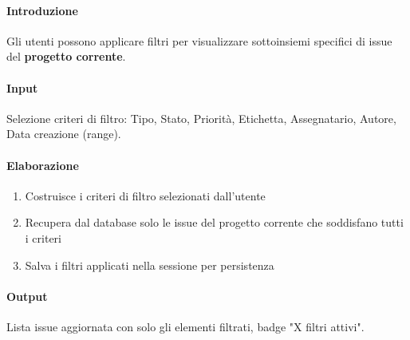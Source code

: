 \begin{reqbox}[title=REQ-FUN-15: Filtra Issue]
\label{subsubsec:req-filtra-issue}

\paragraph{Introduzione}
Gli utenti possono applicare filtri per visualizzare sottoinsiemi specifici di issue del \textbf{progetto corrente}.

\paragraph{Input}
Selezione criteri di filtro: Tipo, Stato, Priorità, Etichetta, Assegnatario, Autore, Data creazione (range).

\paragraph{Elaborazione}
\begin{enumerate}[leftmargin=1.1em]
\item Costruisce i criteri di filtro selezionati dall'utente
\item Recupera dal database solo le issue del progetto corrente che soddisfano tutti i criteri
\item Salva i filtri applicati nella sessione per persistenza
\end{enumerate}

\paragraph{Output}
Lista issue aggiornata con solo gli elementi filtrati, badge "X filtri attivi".

\end{reqbox}

\vspace{0.5cm}

\newpage


